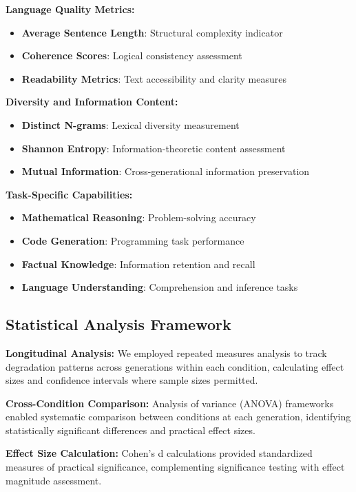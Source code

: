 \documentclass[11pt]{article}
\begin{document}
\textbf{Language Quality Metrics:}
\begin{itemize}
    \item \textbf{Average Sentence Length}: Structural complexity indicator
    \item \textbf{Coherence Scores}: Logical consistency assessment
    \item \textbf{Readability Metrics}: Text accessibility and clarity measures
\end{itemize}

\textbf{Diversity and Information Content:}
\begin{itemize}
    \item \textbf{Distinct N-grams}: Lexical diversity measurement
    \item \textbf{Shannon Entropy}: Information-theoretic content assessment
    \item \textbf{Mutual Information}: Cross-generational information preservation
\end{itemize}

\textbf{Task-Specific Capabilities:}
\begin{itemize}
    \item \textbf{Mathematical Reasoning}: Problem-solving accuracy
    \item \textbf{Code Generation}: Programming task performance
    \item \textbf{Factual Knowledge}: Information retention and recall
    \item \textbf{Language Understanding}: Comprehension and inference tasks
\end{itemize}

\subsection{Statistical Analysis Framework}

\textbf{Longitudinal Analysis:} We employed repeated measures analysis to track degradation patterns across generations within each condition, calculating effect sizes and confidence intervals where sample sizes permitted.

\textbf{Cross-Condition Comparison:} Analysis of variance (ANOVA) frameworks enabled systematic comparison between conditions at each generation, identifying statistically significant differences and practical effect sizes.

\textbf{Effect Size Calculation:} Cohen's d calculations provided standardized measures of practical significance, complementing significance testing with effect magnitude assessment.
\end{document}

